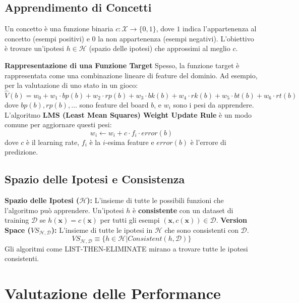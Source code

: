 \documentclass[a4paper,11pt]{article}
\begin{document}
\subsection{Apprendimento di Concetti}
Un concetto è una funzione binaria $c: \mathcal{X} \to \{0,1\}$, dove $1$ indica l'appartenenza al concetto (esempi positivi) e $0$ la non appartenenza (esempi negativi). L'obiettivo è trovare un'ipotesi $h \in \mathcal{H}$ (spazio delle ipotesi) che approssimi al meglio $c$.

\noindent\textbf{Rappresentazione di una Funzione Target}
Spesso, la funzione target è rappresentata come una combinazione lineare di feature del dominio. Ad esempio, per la valutazione di uno stato in un gioco:
\begin{equation}
    \hat{V}(b) = w_0 + w_1 \cdot bp(b) + w_2 \cdot rp(b) + w_3 \cdot bk(b) + w_4 \cdot rk(b) + w_5 \cdot bt(b) + w_6 \cdot rt(b)
\end{equation}
dove $bp(b), rp(b), \dots$ sono feature del board $b$, e $w_i$ sono i pesi da apprendere. L'algoritmo \textbf{LMS (Least Mean Squares) Weight Update Rule} è un modo comune per aggiornare questi pesi:
\begin{equation}
    w_i \leftarrow w_i + c \cdot f_i \cdot error(b)
\end{equation}
dove $c$ è il learning rate, $f_i$ è la $i$-esima feature e $error(b)$ è l'errore di predizione.

\subsection{Spazio delle Ipotesi e Consistenza}
\textbf{Spazio delle Ipotesi ($\mathcal{H}$):} L'insieme di tutte le possibili funzioni che l'algoritmo può apprendere.
Un'ipotesi $h$ è \textbf{consistente} con un dataset di training $\mathcal{D}$ se $h(\mathbf{x}) = c(\mathbf{x})$ per tutti gli esempi $(\mathbf{x}, c(\mathbf{x})) \in \mathcal{D}$.
\noindent\textbf{Version Space ($VS_{\mathcal{H}, \mathcal{D}}$):} L'insieme di tutte le ipotesi in $\mathcal{H}$ che sono consistenti con $\mathcal{D}$.
\begin{equation}
    VS_{\mathcal{H},\mathcal{D}} \equiv \{h \in \mathcal{H} | Consistent(h, \mathcal{D})\}
\end{equation}
Gli algoritmi come LIST-THEN-ELIMINATE mirano a trovare tutte le ipotesi consistenti.

\section{Valutazione delle Performance}
\end{document}
